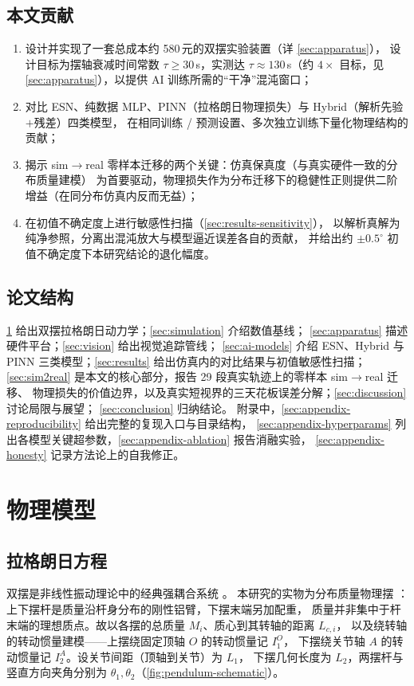 \documentclass[a4paper,12pt]{ctexart}   %
\let\cite\supercite   %
\newcommand{\thetaone}{\theta_1}
\newcommand{\thetatwo}{\theta_2}
\renewcommand{\emph}[1]{#1}
\begin{document}
\subsection{本文贡献}
\begin{enumerate}[leftmargin=2em]
  \item 设计并实现了一套总成本约 580\,元的双摆实验装置（详 \cref{sec:apparatus}），
        设计目标为摆轴衰减时间常数 $\tau \geq 30$\,s，实测达 $\tau \approx 130$\,s（约 $4\times$ 目标，见 \cref{sec:apparatus}），以提供 AI 训练所需的“干净”混沌窗口；
  \item 对比 ESN、纯数据 MLP、PINN（拉格朗日物理损失）与 Hybrid（解析先验$+$残差）四类模型，
        在相同训练 / 预测设置、多次独立训练下量化物理结构的贡献；
  \item 揭示 sim$\to$real 零样本迁移的两个关键：仿真保真度（与真实硬件一致的\emph{分布质量}建模）
        为首要驱动，物理损失作为分布迁移下的稳健性正则提供二阶增益（在同分布仿真内反而无益）；
  \item 在初值不确定度上进行敏感性扫描（\cref{sec:results-sensitivity}），
        以解析真解为纯净参照，分离出混沌放大与模型逼近误差各自的贡献，
        并给出约 $\pm 0.5^\circ$ 初值不确定度下本研究结论的退化幅度。
\end{enumerate}

\subsection{论文结构}
\cref{sec:physics-model} 给出双摆拉格朗日动力学；\cref{sec:simulation} 介绍数值基线；
\cref{sec:apparatus} 描述硬件平台；\cref{sec:vision} 给出视觉追踪管线；
\cref{sec:ai-models} 介绍 ESN、Hybrid 与 PINN 三类模型；\cref{sec:results} 给出仿真内的对比结果与初值敏感性扫描；
\cref{sec:sim2real} 是本文的核心部分，报告 29 段真实轨迹上的零样本 sim$\to$real 迁移、
物理损失的价值边界，以及真实短视界的三天花板误差分解；\cref{sec:discussion} 讨论局限与展望；
\cref{sec:conclusion} 归纳结论。
附录中，\cref{sec:appendix-reproducibility} 给出完整的复现入口与目录结构，
\cref{sec:appendix-hyperparams} 列出各模型关键超参数，\cref{sec:appendix-ablation} 报告消融实验，
\cref{sec:appendix-honesty} 记录方法论上的自我修正。

\section{物理模型}
\label{sec:physics-model}

\subsection{拉格朗日方程}
双摆是非线性振动理论中的经典强耦合系统 \cite{nayfeh2008nonlinear}。
本研究的实物为\emph{分布质量}物理摆 \cite{rafat2009distmass}：上下摆杆是质量沿杆身分布的刚性铝臂，下摆末端另加配重，
质量并非集中于杆末端的理想质点。故以各摆的总质量 $M_i$、质心到其转轴的距离 $L_{c,i}$，
以及绕转轴的转动惯量建模——上摆绕固定顶轴 $O$ 的转动惯量记 $I_1^{O}$，
下摆绕关节轴 $A$ 的转动惯量记 $I_2^{A}$。设关节间距（顶轴到关节）为 $L_1$，
下摆几何长度为 $L_2$，两摆杆与竖直方向夹角分别为 $\thetaone, \thetatwo$（\cref{fig:pendulum-schematic}）。
\end{document}
